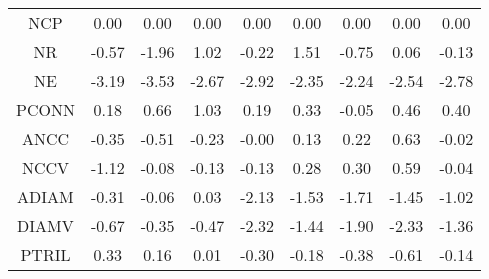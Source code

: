 \documentclass[11pt,a4paper]{report}
\begin{document}
\begin{centering}
\begin{longtable}{ | c || c | c | c | c | c | c | c || c |}
NCP &  \cellcolor[HTML]{FFFFFF} 0.00 &  \cellcolor[HTML]{FFFFFF} 0.00 &  \cellcolor[HTML]{FFFFFF} 0.00 &  \cellcolor[HTML]{FFFFFF} 0.00 &  \cellcolor[HTML]{FFFFFF} 0.00 &  \cellcolor[HTML]{FFFFFF} 0.00 &  \cellcolor[HTML]{FFFFFF} 0.00 &  \cellcolor[HTML]{FFFFFF} 0.00 \\
NR &  \cellcolor[HTML]{FFEFEF} -0.57 &  \cellcolor[HTML]{FFCFCF} -1.96 &  \cellcolor[HTML]{E7E7FF} 1.02 &  \cellcolor[HTML]{FFF7F7} -0.22 &  \cellcolor[HTML]{D7D7FF} 1.51 &  \cellcolor[HTML]{FFEFEF} -0.75 &  \cellcolor[HTML]{FFFFFF} 0.06 &  \cellcolor[HTML]{FFFFFF} -0.13 \\
NE &  \cellcolor[HTML]{FFAFAF} -3.19 &  \cellcolor[HTML]{FFA7A7} -3.53 &  \cellcolor[HTML]{FFBFBF} -2.67 &  \cellcolor[HTML]{FFB7B7} -2.92 &  \cellcolor[HTML]{FFC7C7} -2.35 &  \cellcolor[HTML]{FFC7C7} -2.24 &  \cellcolor[HTML]{FFBFBF} -2.54 &  \cellcolor[HTML]{FFB7B7} -2.78 \\
PCONN &  \cellcolor[HTML]{F7F7FF} 0.18 &  \cellcolor[HTML]{EFEFFF} 0.66 &  \cellcolor[HTML]{E7E7FF} 1.03 &  \cellcolor[HTML]{F7F7FF} 0.19 &  \cellcolor[HTML]{F7F7FF} 0.33 &  \cellcolor[HTML]{FFFFFF} -0.05 &  \cellcolor[HTML]{F7F7FF} 0.46 &  \cellcolor[HTML]{F7F7FF} 0.40 \\
ANCC &  \cellcolor[HTML]{FFF7F7} -0.35 &  \cellcolor[HTML]{FFEFEF} -0.51 &  \cellcolor[HTML]{FFF7F7} -0.23 &  \cellcolor[HTML]{FFFFFF} -0.00 &  \cellcolor[HTML]{FFFFFF} 0.13 &  \cellcolor[HTML]{F7F7FF} 0.22 &  \cellcolor[HTML]{EFEFFF} 0.63 &  \cellcolor[HTML]{FFFFFF} -0.02 \\
NCCV &  \cellcolor[HTML]{FFDFDF} -1.12 &  \cellcolor[HTML]{FFFFFF} -0.08 &  \cellcolor[HTML]{FFFFFF} -0.13 &  \cellcolor[HTML]{FFFFFF} -0.13 &  \cellcolor[HTML]{F7F7FF} 0.28 &  \cellcolor[HTML]{F7F7FF} 0.30 &  \cellcolor[HTML]{EFEFFF} 0.59 &  \cellcolor[HTML]{FFFFFF} -0.04 \\
ADIAM &  \cellcolor[HTML]{FFF7F7} -0.31 &  \cellcolor[HTML]{FFFFFF} -0.06 &  \cellcolor[HTML]{FFFFFF} 0.03 &  \cellcolor[HTML]{FFC7C7} -2.13 &  \cellcolor[HTML]{FFD7D7} -1.53 &  \cellcolor[HTML]{FFD7D7} -1.71 &  \cellcolor[HTML]{FFD7D7} -1.45 &  \cellcolor[HTML]{FFE7E7} -1.02 \\
DIAMV &  \cellcolor[HTML]{FFEFEF} -0.67 &  \cellcolor[HTML]{FFF7F7} -0.35 &  \cellcolor[HTML]{FFF7F7} -0.47 &  \cellcolor[HTML]{FFC7C7} -2.32 &  \cellcolor[HTML]{FFD7D7} -1.44 &  \cellcolor[HTML]{FFCFCF} -1.90 &  \cellcolor[HTML]{FFC7C7} -2.33 &  \cellcolor[HTML]{FFDFDF} -1.36 \\
PTRIL &  \cellcolor[HTML]{F7F7FF} 0.33 &  \cellcolor[HTML]{F7F7FF} 0.16 &  \cellcolor[HTML]{FFFFFF} 0.01 &  \cellcolor[HTML]{FFF7F7} -0.30 &  \cellcolor[HTML]{FFF7F7} -0.18 &  \cellcolor[HTML]{FFF7F7} -0.38 &  \cellcolor[HTML]{FFEFEF} -0.61 &  \cellcolor[HTML]{FFFFFF} -0.14 \\

\end{longtable}
\end{centering}
\end{document}
